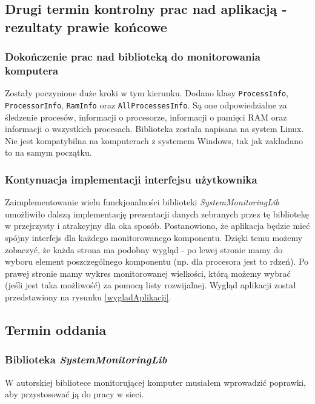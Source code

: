 \documentclass[a4paper]{article}
\begin{document}
\subsection{Drugi termin kontrolny prac nad aplikacją - rezultaty prawie końcowe}

\subsubsection{Dokończenie prac nad biblioteką do monitorowania komputera}

Zostały poczynione duże kroki w tym kierunku. Dodano klasy \texttt{ProcessInfo}, \texttt{ProcessorInfo}, \texttt{RamInfo} oraz \texttt{AllProcessesInfo}. Są one odpowiedzialne za śledzenie procesów, informacji o procesorze, informacji o pamięci
RAM oraz informacji o wszystkich procesach. Biblioteka została napisana na system Linux. Nie jest kompatybilna na komputerach z systemem Windows, tak jak zakładano to na samym początku. 

\subsubsection{Kontynuacja implementacji interfejsu użytkownika}

Zaimplementowanie wielu funckjonalności biblioteki \textit{SystemMonitoringLib} umożliwiło dalszą implementację
prezentacji danych zebranych przez tę bibliotekę w przejrzysty i atrakcyjny dla oka sposób. Postanowiono, że aplikacja
będzie mieć spójny interfejs dla każdego monitorowanego komponentu. Dzięki temu możemy zobaczyć, że każda strona ma podobny wygląd - po lewej stronie mamy do wyboru element poszczególnego komponentu (np. dla procesora jest to rdzeń). Po prawej stronie mamy wykres monitorowanej wielkości, którą możemy wybrać (jeśli jest taka możliwość) za pomocą listy rozwijalnej. Wygląd aplikacji został przedstawiony na rysunku \ref{wygladAplikacji}.

\subsection{Termin oddania}



\subsubsection{Biblioteka \textit{SystemMonitoringLib}}
W autorskiej bibliotece monitorującej komputer musiałem wprowadzić poprawki, aby przystosować ją
do pracy w sieci. 
\end{document}
